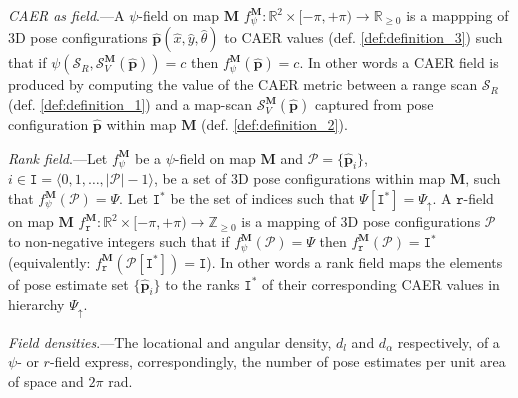 \begin{definition}
  \label{def:definition_4} \textit{CAER as field}.---A $\psi$-field on map
  $\bm{M}$
  $f_{\psi}^{\bm{M}} : \mathbb{R}^2 \times [-\pi, +\pi) \rightarrow \mathbb{R}_{\geq 0}$
  is a mappping of 3D pose configurations
  $\hat{\bm{p}}(\hat{x},\hat{y},\hat{\theta})$ to CAER values (def.
  \ref{def:definition_3}) such that if
  $\psi(\mathcal{S}_R,\mathcal{S}_V^{\bm{M}}(\hat{\bm{p}})) = c$ then
  $f_{\psi}^{\bm{M}}(\hat{\bm{p}}) = c$. In other words a CAER field is
  produced by computing the value of the CAER metric between a range scan
  $\mathcal{S}_R$ (def. \ref{def:definition_1}) and a map-scan
  $\mathcal{S}_V^{\bm{M}}(\hat{\bm{p}})$ captured from pose configuration
  $\hat{\bm{p}}$ within map $\bm{M}$ (def. \ref{def:definition_2}).
\end{definition}

\begin{definition}
  \label{def:definition_5} \textit{Rank field}.---Let $f_{\psi}^{\bm{M}}$ be
  a $\psi$-field on map $\bm{M}$ and $\mathcal{P} = \{\hat{\bm{p}}_i\}$,
  $i \in \texttt{I} = \langle 0,1,\dots,|\mathcal{P}|-1 \rangle$, be a set of 3D pose
  configurations within map $\bm{M}$, such that
  $f_{\psi}^{\bm{M}}(\mathcal{P}) = \Psi$. Let $\texttt{I}^{\ast}$
  be the set of indices such that $\Psi[\texttt{I}^{\ast}] = \Psi_\uparrow$.
  A $\texttt{r}$-field on map $\bm{M}$
  $f_{\texttt{r}}^{\bm{M}} : \mathbb{R}^2 \times [-\pi, +\pi) \rightarrow \mathbb{Z}_{\geq 0}$
  is a mapping of 3D pose configurations $\mathcal{P}$ to non-negative integers
  such that if $f_{\psi}^{\bm{M}}(\mathcal{P}) = \Psi$ then
  $f_{\texttt{r}}^{\bm{M}}(\mathcal{P}) = \texttt{I}^\ast$
  (equivalently:
  $f_{\texttt{r}}^{\bm{M}}(\mathcal{P}[\texttt{I}^\ast]) = \texttt{I}$).
  In other words a rank field maps the elements of pose estimate set $\{\hat{\bm{p}}_i\}$
  to the ranks $\texttt{I}^\ast$ of their corresponding CAER values in
  hierarchy $\Psi_\uparrow$.
\end{definition}

\begin{definition}
  \label{def:definition_6} \textit{Field densities}.---The locational and
  angular density, $d_l$ and $d_{\alpha}$ respectively, of a
  $\psi$- or $r$-field express, correspondingly, the number of pose estimates
  per unit area of space and $2\pi$ rad.
\end{definition}
